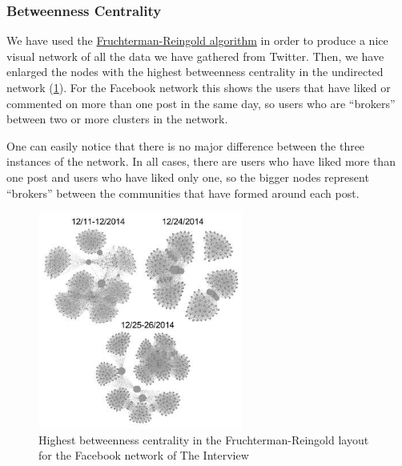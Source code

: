 \documentclass{llncs}
\begin{document}
\subsubsection{Betweenness Centrality}
We have used the
\href{https://en.wikipedia.org/wiki/Force-directed_graph_drawing}{Fruchterman-Reingold
algorithm} in order to produce a nice visual network of all the data we have
gathered from Twitter. Then, we have enlarged the nodes with the highest
betweenness centrality in the undirected network
(\ref{fig:interview-facebook-betweennes-centrality}). For the Facebook network
this shows the users that have liked or commented on more than one post in the
same day, so users who are “brokers” between two or more clusters in the
network.

One can easily notice that there is no major difference between the three
instances of the network. In all cases, there are users who have liked more than
one post and users who have liked only one, so the bigger nodes represent
“brokers” between the communities that have formed around each post.
%
\begin{figure}
\centering
\includegraphics[width=0.6\textwidth]{interview-facebook-betweennes-centrality.jpg}
\caption{Highest betweenness centrality in the Fruchterman-Reingold layout for
    the Facebook network of The Interview
\label{fig:interview-facebook-betweennes-centrality}}
\end{figure}
%
\end{document}
